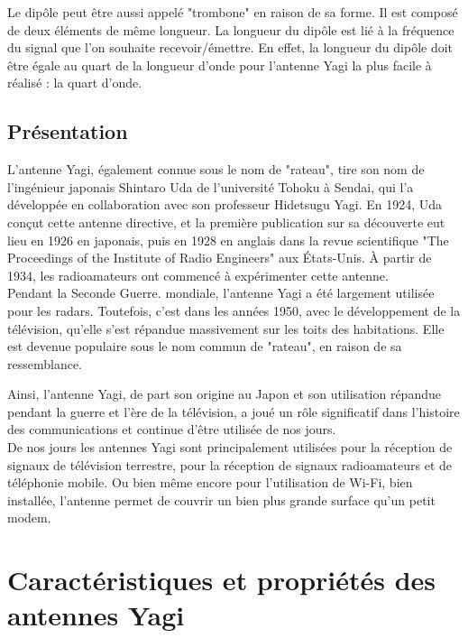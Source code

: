 \documentclass[12pt, a4paper]{article}
\begin{document}
Le dipôle peut être aussi appelé "trombone" en raison de sa
forme. Il est composé de deux éléments de même longueur. 
La longueur du dipôle est lié à la fréquence du signal
que l'on souhaite recevoir/émettre. En effet, la longueur
du dipôle doit être égale au quart de la longueur d'onde 
pour l'antenne Yagi la plus facile à réalisé : la quart d'onde.



\subsection{Présentation}

L'antenne Yagi, également connue sous le nom de 
"rateau", tire son nom de l'ingénieur japonais 
Shintaro Uda de l'université Tohoku à Sendai, qui 
l'a développée en collaboration avec son professeur 
Hidetsugu Yagi. En 1924, Uda conçut cette antenne 
directive, et la première publication sur sa découverte 
eut lieu en 1926 en japonais, puis en 1928 en anglais 
dans la revue scientifique "The Proceedings of the 
Institute of Radio Engineers" aux États-Unis. 
À partir de 1934, les radioamateurs ont commencé à
expérimenter cette antenne.\\

Pendant la Seconde Guerre. mondiale, l'antenne 
Yagi a été largement utilisée pour les radars.
Toutefois, c'est dans les années 1950, avec le
développement de la télévision, qu'elle s'est
répandue massivement sur les toits des habitations.
Elle est devenue populaire sous le nom
commun de "rateau", en raison de sa ressemblance.

Ainsi, l'antenne Yagi, de part son origine au Japon et
son utilisation répandue pendant la guerre et l'ère
de la télévision, a joué un rôle significatif dans
l'histoire des communications et continue d'être
utilisée de nos jours.\\

De nos jours les antennes Yagi sont principalement 
utilisées pour la réception de signaux de télévision
terrestre, pour la réception de signaux
radioamateurs et de téléphonie mobile. Ou bien même 
encore pour l'utilisation de Wi-Fi, bien installée, 
l'antenne permet de couvrir un bien plus grande surface 
qu'un petit modem. 


\section{Caractéristiques et propriétés des antennes Yagi}
\end{document}
